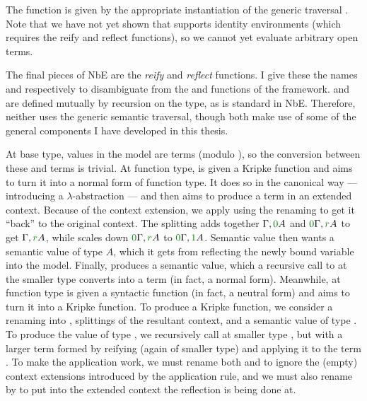 The function  is given by the appropriate instantiation of
the generic traversal .
Note that we have not yet shown that \AgdaFunction{\_$\vDash$\_} supports
identity environments (which requires the reify and reflect functions), so we
cannot yet evaluate arbitrary open terms.


The final pieces of NbE are the \emph{reify} and \emph{reflect} functions.
I give these the names  and 
respectively to disambiguate from the  and
 functions of the framework.
 and  are defined mutually by
recursion on the type, as is standard in NbE.
Therefore, neither uses the generic semantic traversal, though both make use of
some of the general components I have developed in this thesis.

At base type, values in the model are terms (modulo ), so the
conversion between these and terms is trivial.
At function type,  is given a Kripke function
 and aims to turn it into a normal form of function type.
It does so in the canonical way --- introducing a $\lambda$-abstraction --- and
then aims to produce a term in an extended context.
Because of the context extension, we apply  using the renaming
\AgdaSpace{}\AgdaSymbol{:}\AgdaSpace{}%
\AgdaBound{$\Gamma$}\AgdaSpace{}\AgdaSpace{}%
\AgdaFunction{[}\AgdaSpace{}\AgdaSpace{}\AgdaFunction{$\bullet$}%
\AgdaSpace{}\AgdaSpace{}\AgdaFunction{]$^c$}
to get it ``back'' to the original context.
The splitting  adds together $\Gamma, \gr0A$ and
$\gr0\Gamma, \gr rA$ to get $\Gamma, \gr rA$, while  scales down
$\gr0\Gamma, \gr rA$ to $\gr0\Gamma, \gr1A$.
Semantic value  then wants a semantic value of type $A$, which it
gets from reflecting the newly bound variable into the model.
Finally,  produces a semantic value, which a recursive call to
 at the smaller type  converts into a term
(in fact, a normal form).
Meanwhile,  at function type is given a syntactic
function (in fact, a neutral form) and aims to turn it into a Kripke function.
To produce a Kripke function, we consider a renaming \AgdaBound{$\rho$} into
\AgdaBound{$\Gamma$}, splittings of the resultant context, and a semantic value
 of type .
To produce the value of type , we recursively call
 at smaller type , but with a larger term
formed by reifying  (again of smaller type) and applying it to the
term .
To make the application work, we must rename both  and
 to ignore the (empty) context extensions introduced by the
application rule, and we must also rename  by \AgdaBound{$\rho$} to
put  into the extended context the reflection is being done at.

